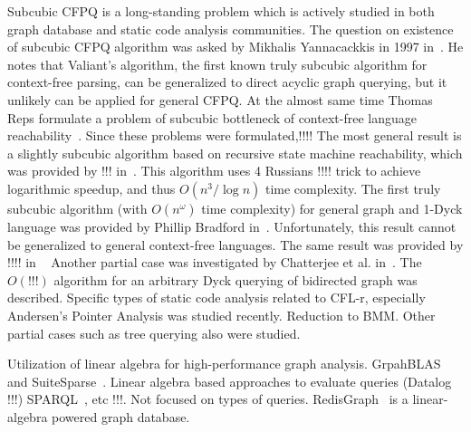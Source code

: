 Subcubic CFPQ is a long-standing problem which is actively studied in both graph database and static code analysis communities.
The question on existence of subcubic CFPQ algorithm was asked by Mikhalis Yannacackkis in 1997 in~\cite{!!!}. He notes that Valiant's algorithm, the first known truly subcubic algorithm for context-free parsing, can be generalized to direct acyclic graph querying, but it unlikely can be applied for general CFPQ. 
At the almost same time Thomas Reps formulate a problem of subcubic bottleneck of context-free language reachability~\cite{!!!}.
Since these problems were formulated,!!!!
The most general result is a slightly subcubic algorithm based on recursive state machine reachability, which was provided by !!! in~\cite{rsm:analysis:10.1007/3-540-44585-4_18}. This algorithm uses 4 Russians !!!! trick to achieve logarithmic speedup, and thus $O(n^3/\log{n})$ time complexity. 
The first truly subcubic algorithm (with $O(n^\omega)$ time complexity) for general graph and 1-Dyck language was provided by Phillip Bradford in~\cite{Bradford2017EfficientEP}. Unfortunately, this result cannot be generalized to general context-free languages.
The same result was provided by !!!! in ~\cite{zhang2020conditional,pavlogiannis2020finegrained}
Another partial case was investigated by Chatterjee et al. in~\cite{10.1145/3158118}.
The $O(!!!)$ algorithm for an arbitrary Dyck querying of bidirected graph was described.
Specific types of static code analysis related to CFL-r, especially Andersen's Pointer Analysis was studied recently. Reduction to BMM.
Other partial cases such as tree querying also were studied.

Utilization of linear algebra for high-performance graph analysis.
GrpahBLAS~\cite{!!!} and SuiteSparse~\cite{!!!}.
Linear algebra based approaches to evaluate queries (Datalog !!!) SPARQL~\cite{10.1145/3302424.3303962,DBLP:journals/corr/MetzlerM15a}, etc !!!. 
Not focused on types of queries.
RedisGraph~\cite{!!!} is a linear-algebra powered graph database.